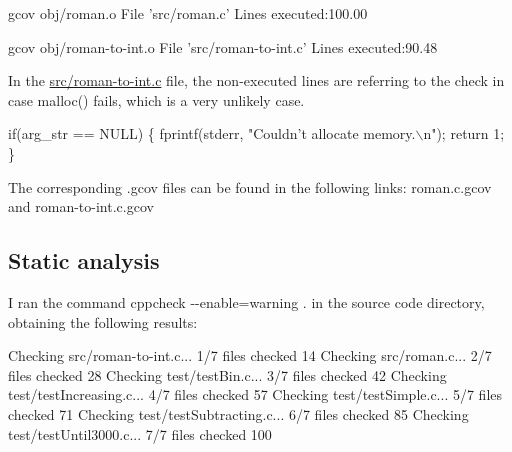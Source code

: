 \begin{DoxyCode}
gcov obj/roman.o
File \textcolor{stringliteral}{'src/roman.c'}
Lines executed:100.00%
\end{DoxyCode}



\begin{DoxyCode}
gcov obj/roman-to-\textcolor{keywordtype}{int}.o
File \textcolor{stringliteral}{'src/roman-to-int.c'}
Lines executed:90.48%
\end{DoxyCode}


In the \hyperlink{roman-to-int_8c}{src/roman-\/to-\/int.\+c} file, the non-\/executed lines are referring to the check in case malloc() fails, which is a very unlikely case.


\begin{DoxyCode}
\textcolor{keywordflow}{if}(arg\_str == NULL) \{
    fprintf(stderr, \textcolor{stringliteral}{"Couldn't allocate memory.\(\backslash\)n"});
    \textcolor{keywordflow}{return} 1;
\}
\end{DoxyCode}


The corresponding .gcov files can be found in the following links\+: roman.\+c.\+gcov and roman-\/to-\/int.\+c.\+gcov

\subsection*{Static analysis }

I ran the command {\ttfamily cppcheck -\/-\/enable=warning .} in the source code directory, obtaining the following results\+:


\begin{DoxyCode}
Checking src/roman-to-\textcolor{keywordtype}{int}.c...
1/7 files checked 14%
Checking src/roman.c...
2/7 files checked 28%
Checking test/testBin.c...
3/7 files checked 42%
Checking test/testIncreasing.c...
4/7 files checked 57%
Checking test/testSimple.c...
5/7 files checked 71%
Checking test/testSubtracting.c...
6/7 files checked 85%
Checking test/testUntil3000.c...
7/7 files checked 100%
\end{DoxyCode}
 